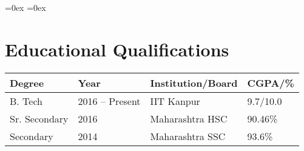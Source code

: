 \setlength\extrarowheight{3pt}  %
\aboverulesep=0ex %
\belowrulesep=0ex %

\section*{Educational Qualifications}
\begin{tabularx}{\textwidth}{L L L L}

\toprule
\textbf{Degree} & \textbf{Year}   & \textbf{Institution/Board} & \textbf{CGPA/\%}\\
\midrule
B. Tech         & 2016 -- Present & IIT Kanpur                 & 9.7/10.0\\%
Sr. Secondary   & 2016            & Maharashtra HSC            & 90.46\%\\
Secondary       & 2014            & Maharashtra SSC            & 93.6\%\\
\bottomrule

\end{tabularx}\\[-1mm]
